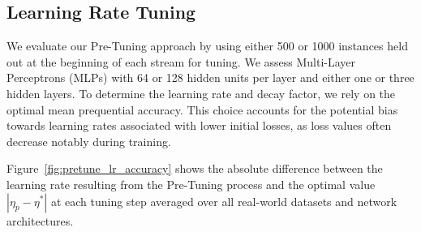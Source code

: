 \documentclass{article} %
\begin{document}
\subsection{Learning Rate Tuning}

We evaluate our Pre-Tuning approach by using either 500 or 1000 instances held out at the beginning of each stream for tuning. We assess Multi-Layer Perceptrons (MLPs) with 64 or 128 hidden units per layer and either one or three hidden layers.
To determine the learning rate and decay factor, we rely on the optimal mean prequential accuracy. This choice accounts for the potential bias towards learning rates associated with lower initial losses, as loss values often decrease notably during training.

Figure~\ref{fig:pretune_lr_accuracy} shows the absolute difference between the learning rate resulting from the Pre-Tuning process and the optimal value $|\eta_p - \eta^*|$ at each tuning step averaged over all real-world datasets and network architectures.
\end{document}
